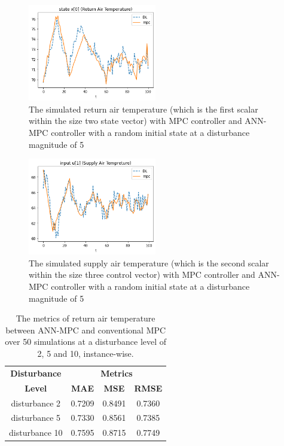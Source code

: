 \documentclass[conference]{IEEEtran}
\begin{document}
\begin{figure}[htbp]
\centerline{\includegraphics[width=0.5\textwidth]{Figures/Return_Air_Temperature.png}}
\caption{The simulated return air temperature (which is the first scalar within the size two state vector) with MPC controller and ANN-MPC controller with a random initial state at a disturbance magnitude of 5}
\label{fig_RA_ANN}
\end{figure}

\begin{figure}[htbp]
\centerline{\includegraphics[width=0.5\textwidth]{Figures/Supply_Air_Temperature.png}}
\caption{The simulated supply air temperature (which is the second scalar within the size three control vector) with MPC controller and ANN-MPC controller with a random initial state at a disturbance magnitude of 5}
\label{fig_SA_ANN}
\end{figure}


\begin{table}[htbp]
\caption{The metrics of return air temperature between ANN-MPC and conventional MPC over 50 simulations at a disturbance level of 2, 5 and 10, instance-wise.}
\begin{center}
\begin{tabular}{|c|c|c|c|}
\hline
\textbf{Disturbance} &\multicolumn{3}{|c|}{\textbf{Metrics}} \\
\cline{2-4} 
\textbf{Level}&\textbf{MAE} & \textbf{MSE} & \textbf{RMSE}  \\
\hline
disturbance 2 & 0.7209 & 0.8491 & 0.7360
\\
disturbance 5 & 0.7330 & 0.8561 & 0.7385
\\
disturbance 10 & 0.7595 & 0.8715 & 0.7749\\
\hline
\end{tabular}
\label{tab_ANN_Dis}
\end{center}
\end{table}
\end{document}
